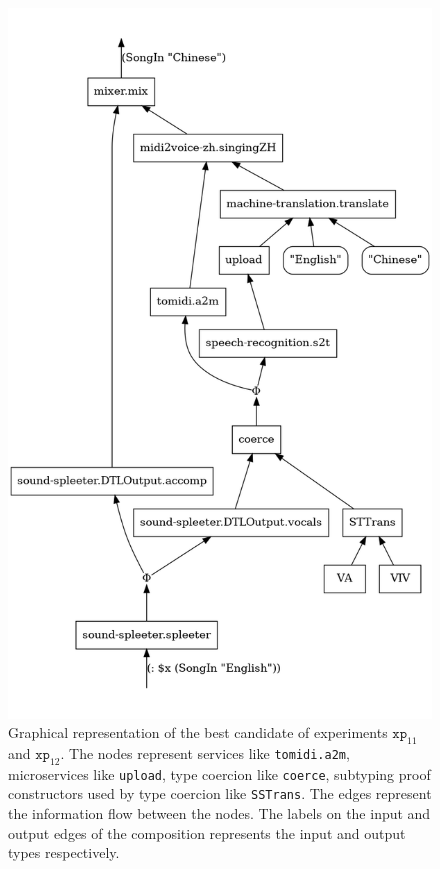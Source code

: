 \documentclass[]{report}
\begin{document}
\begin{figure}[H]
  \centering
  \includegraphics[scale=0.35]{figs/cnd-3.png}
  \caption{Graphical representation of the best candidate of
    experiments $\texttt{xp}_{11}$ and $\texttt{xp}_{12}$.  The nodes
    represent services like \texttt{tomidi.a2m},
    microservices like \texttt{upload}, type coercion like
    \texttt{coerce}, subtyping proof constructors used by
    type coercion like \texttt{SSTrans}.  The edges
    represent the information flow between the nodes.  The labels on
    the input and output edges of the composition represents the input
    and output types respectively.}
  \label{fig:corcnd}
\end{figure}
\end{document}
